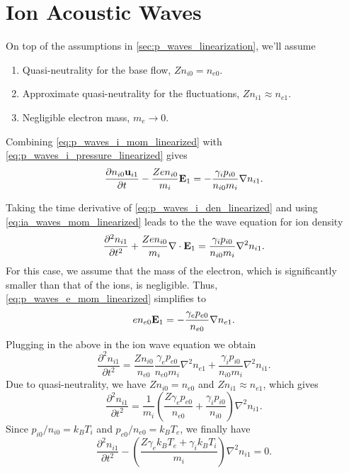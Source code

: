 \documentclass[a4paper,11pt]{report}
\begin{document}
\section{Ion Acoustic Waves}
On top of the assumptions in \cref{sec:p_waves_linearization}, we'll assume 
\begin{enumerate}
    \item Quasi-neutrality for the base flow, $Zn_{i0} = n_{e0}$.
    \item Approximate quasi-neutrality for the fluctuations, $Z n_{i1} \approx n_{e1}$.
    \item Negligible electron mass, $m_e \to 0$.
\end{enumerate}

Combining \cref{eq:p_waves_i_mom_linearized} with \cref{eq:p_waves_i_pressure_linearized} gives
\begin{equation}
    \label{eq:ia_waves_mom_linearized}
    \frac{\partial n_{i0} \mathbf{u}_{i1}}{\partial t} - \frac{Z e n_{i0}}{m_i} \mathbf{E}_1 = - \frac{\gamma_i p_{i0}}{n_{i0} m_i} \nabla n_{i1}.
\end{equation}

Taking the time derivative of \cref{eq:p_waves_i_den_linearized} and using \cref{eq:ia_waves_mom_linearized} leads to the the wave equation for ion density
\begin{equation}
    \label{eq:ia_waves_den_combined}
    \frac{\partial^2 n_{i1}}{\partial t^2} + \frac{Z e n_{i0}}{m_i} \nabla \cdot \mathbf{E}_1 = \frac{\gamma_i p_{i0}}{n_{i0} m_i} \nabla^2 n_{i1}.
\end{equation}
For this case, we assume that the mass of the electron, which is significantly smaller than that of the ions, is negligible. Thus, \cref{eq:p_waves_e_mom_linearized} simplifies to 
\begin{equation}
    \label{eq:ia_waves_E}
    e n_{e0} \mathbf{E}_1 = - \frac{\gamma_e p_{e0}}{n_{e0}} \nabla n_{e1}.
\end{equation}
Plugging in the above in the ion wave equation we obtain
\begin{equation*}
    \frac{\partial^2 n_{i1}}{\partial t^2} = \frac{Z n_{i0}}{ n_{e0}} \frac{\gamma_e p_{e0}}{n_{e0} m_i} \nabla^2 n_{e1} + \frac{\gamma_i p_{i0}}{n_{i0} m_i} \nabla^2 n_{i1}.
\end{equation*}
Due to quasi-neutrality, we have $Z n_{i0} = n_{e0}$ and $Z n_{i1} \approx n_{e1}$, which gives
\begin{equation*}
    \frac{\partial^2 n_{i1}}{\partial t^2} = \frac{1}{m_i} \left ( \frac{Z \gamma_e p_{e0}}{n_{e0}} + \frac{\gamma_i p_{i0}}{n_{i0}} \right ) \nabla^2 n_{i1}.
\end{equation*}
Since $p_{i0}/n_{i0} = k_B T_i$ and $p_{e0}/n_{e0} = k_B T_e$, we finally have
\begin{equation}
    \frac{\partial^2 n_{i1}}{\partial t^2} - \left ( \frac{Z \gamma_e k_B T_e + \gamma_i k_B T_i}{m_i} \right ) \nabla^2 n_{i1} = 0.
\end{equation}
\end{document}
